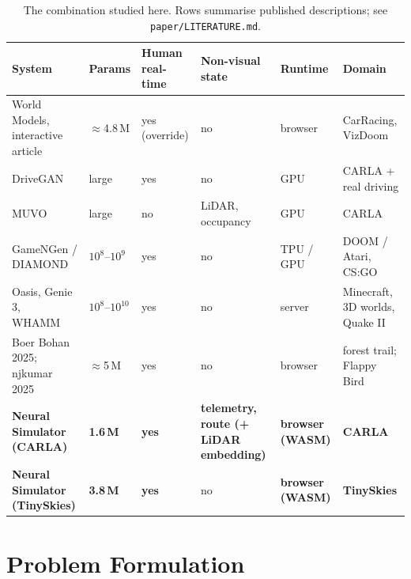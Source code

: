 \documentclass[11pt]{article}
\begin{document}
\begin{table}[!htbp]
  \centering
  \footnotesize
  \setlength{\tabcolsep}{4pt}
  \caption{The combination studied here. Rows summarise published descriptions; see \texttt{paper/LITERATURE.md}.}
  \label{tab:positioning}
  \begin{tabularx}{\linewidth}{@{}>{\raggedright\arraybackslash}p{3.6cm} l >{\raggedright\arraybackslash}p{1.5cm} Y l Y@{}}
    \toprule
    System & Params & Human real-time & Non-visual state & Runtime & Domain \\
    \midrule
    World Models, interactive article~\cite{ha2018worldmodels,ha2018interactive} & $\approx$4.8\,M & yes (override) & no & browser & CarRacing, VizDoom \\
    DriveGAN~\cite{kim2021drivegan} & large & yes & no & GPU & CARLA + real driving \\
    MUVO~\cite{bogdoll2025muvo} & large & no & LiDAR, occupancy & GPU & CARLA \\
    GameNGen / DIAMOND~\cite{valevski2025gamengen,alonso2024diamond} & $10^{8}$--$10^{9}$ & yes & no & TPU / GPU & DOOM / Atari, CS:GO \\
    Oasis, Genie 3, WHAMM~\cite{decart2024oasis,parkerholder2025genie3,microsoft2025whamm} & $10^{8}$--$10^{10}$ & yes & no & server & Minecraft, 3D worlds, Quake II \\
    Boer Bohan 2025; njkumar 2025~\cite{boerbohan2025world,kumar2025flappy} & $\approx$5\,M & yes & no & browser & forest trail; Flappy Bird \\
    \textbf{Neural Simulator (CARLA)} & \textbf{1.6\,M} & \textbf{yes} & \textbf{telemetry, route (+ LiDAR embedding)} & \textbf{browser (WASM)} & \textbf{CARLA} \\
    \textbf{Neural Simulator (TinySkies)} & \textbf{3.8\,M} & \textbf{yes} & no & \textbf{browser (WASM)} & \textbf{TinySkies} \\
    \bottomrule
  \end{tabularx}
\end{table}

\section{Problem Formulation}
\label{sec:problem}
\end{document}
